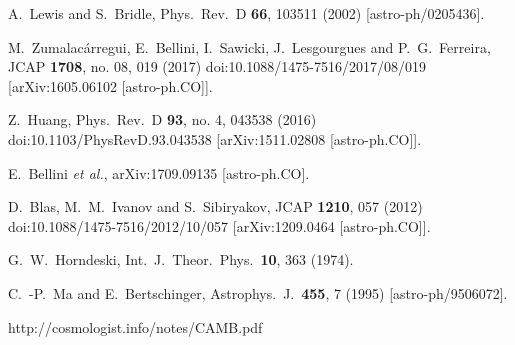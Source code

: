 \documentclass[prd,nofootinbib,showpacs]{revtex4}
\begin{document}
{\begin{thebibliography}{999}
  A.~Lewis and S.~Bridle,
  Phys.\ Rev.\ D {\bf 66}, 103511 (2002)
  [astro-ph/0205436].
	
  M.~Zumalacárregui, E.~Bellini, I.~Sawicki, J.~Lesgourgues and P.~G.~Ferreira,
  JCAP {\bf 1708}, no. 08, 019 (2017)
  doi:10.1088/1475-7516/2017/08/019
  [arXiv:1605.06102 [astro-ph.CO]].
 
  Z.~Huang,
  Phys.\ Rev.\ D {\bf 93}, no. 4, 043538 (2016)
  doi:10.1103/PhysRevD.93.043538
  [arXiv:1511.02808 [astro-ph.CO]].
  
  E.~Bellini {\it et al.},
  arXiv:1709.09135 [astro-ph.CO].
 
  D.~Blas, M.~M.~Ivanov and S.~Sibiryakov,
  JCAP {\bf 1210}, 057 (2012)
  doi:10.1088/1475-7516/2012/10/057
  [arXiv:1209.0464 [astro-ph.CO]].
  
  G.~W.~Horndeski,
  Int.\ J.\ Theor.\ Phys.\  {\bf 10}, 363 (1974).
	
  C.~-P.~Ma and E.~Bertschinger,
  Astrophys.\ J.\  {\bf 455}, 7 (1995)
  [astro-ph/9506072].
	
	
http://cosmologist.info/notes/CAMB.pdf


\end{thebibliography}}
\end{document}
